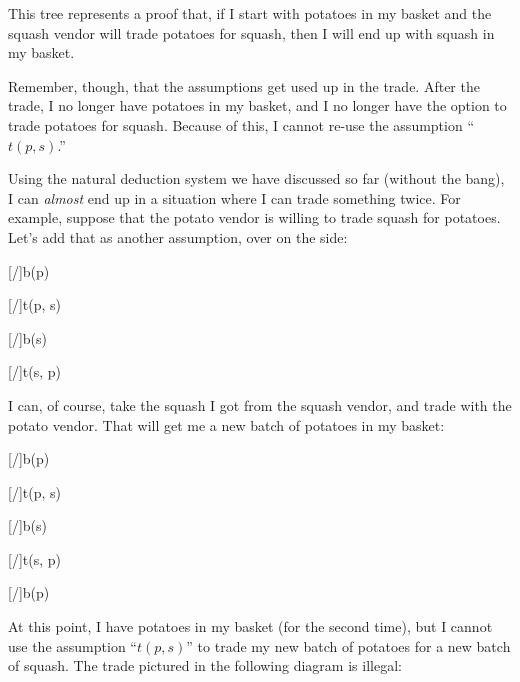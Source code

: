\documentclass[../../../main.tex]{subfiles}
\begin{document}
\noindent
This tree represents a proof that, if I start with potatoes in my basket and the squash vendor will trade potatoes for squash, then I will end up with squash in my basket. 

Remember, though, that the assumptions get used up in the trade. After the trade, I no longer have potatoes in my basket, and I no longer have the option to trade potatoes for squash. Because of this, I cannot re-use the assumption ``$t(p, s)$.'' 

Using the natural deduction system we have discussed so far (without the bang), I can \emph{almost} end up in a situation where I can trade something twice. For example, suppose that the potato vendor is willing to trade squash for potatoes. Let's add that as another assumption, over on the side:

\begin{prooftree*}
  \hypo{}
  [\startrule/]{b(p)}
  
  \hypo{}
  [\startrule/]{t(p, s)}
  
  [\traderule/]{b(s)}
  
  \hypo{}
  [\startrule/]{t(s, p)}
  
\end{prooftree*}

\noindent
I can, of course, take the squash I got from the squash vendor, and trade with the potato vendor. That will get me a new batch of potatoes in my basket:

\begin{prooftree*}
  \hypo{}
  [\startrule/]{b(p)}
  
  \hypo{}
  [\startrule/]{t(p, s)}
  
  [\traderule/]{b(s)}
  
  \hypo{}
  [\startrule/]{t(s, p)}
  
  [\traderule/]{b(p)}
\end{prooftree*}

\noindent
At this point, I have potatoes in my basket (for the second time), but I cannot use the assumption ``$t(p, s)$'' to trade my new batch of potatoes for a new batch of squash. The trade pictured in the following diagram is illegal:
\end{document}
